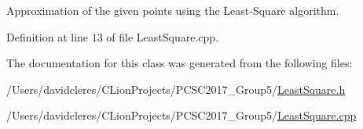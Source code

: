 Approximation of the given points using the Least-\/\+Square algorithm. 



Definition at line 13 of file Least\+Square.\+cpp.



The documentation for this class was generated from the following files\+:\begin{DoxyCompactItemize}
\item 
/\+Users/davidcleres/\+C\+Lion\+Projects/\+P\+C\+S\+C2017\+\_\+\+Group5/\mbox{\hyperlink{_least_square_8h}{Least\+Square.\+h}}\item 
/\+Users/davidcleres/\+C\+Lion\+Projects/\+P\+C\+S\+C2017\+\_\+\+Group5/\mbox{\hyperlink{_least_square_8cpp}{Least\+Square.\+cpp}}\end{DoxyCompactItemize}
